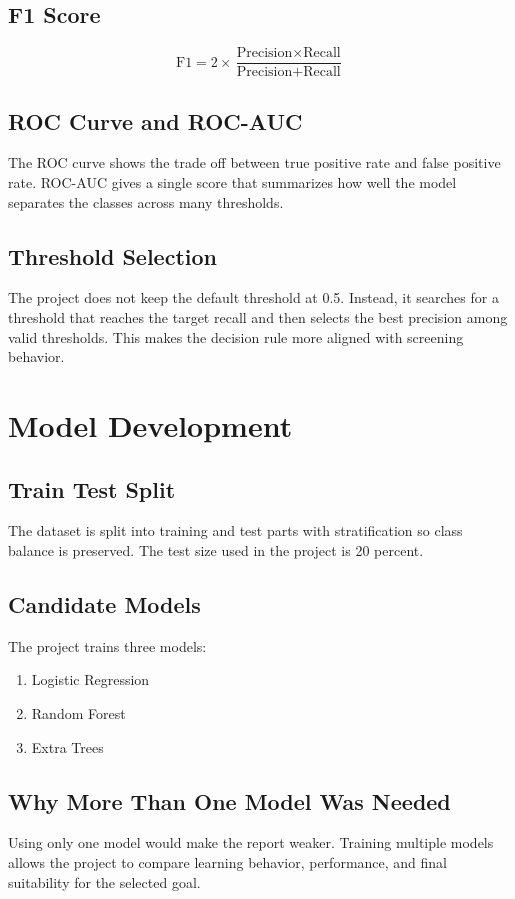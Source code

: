 \documentclass[12pt,a4paper,openany]{report}
\begin{document}
    \section{F1 Score}
    \begin{equation}
    \text{F1} = 2 \times \frac{\text{Precision} \times \text{Recall}}{\text{Precision} + \text{Recall}}
    \end{equation}

    \section{ROC Curve and ROC-AUC}
    The ROC curve shows the trade off between true positive rate and false positive rate. ROC-AUC gives a single score that summarizes how well the model separates the classes across many thresholds.

    \section{Threshold Selection}
    The project does not keep the default threshold at 0.5. Instead, it searches for a threshold that reaches the target recall and then selects the best precision among valid thresholds. This makes the decision rule more aligned with screening behavior.

    \chapter{Model Development}
    \section{Train Test Split}
    The dataset is split into training and test parts with stratification so class balance is preserved. The test size used in the project is 20 percent.

    \section{Candidate Models}
    The project trains three models:
    \begin{enumerate}[leftmargin=1.4cm]
    \item Logistic Regression
    \item Random Forest
    \item Extra Trees
    \end{enumerate}

    \section{Why More Than One Model Was Needed}
    Using only one model would make the report weaker. Training multiple models allows the project to compare learning behavior, performance, and final suitability for the selected goal.
\end{document}
